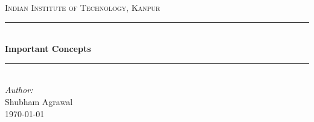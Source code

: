 \begin{titlepage}

\newcommand{\HRule}{\rule{\linewidth}{0.5mm}} %

\center %
 

\textsc{\LARGE Indian Institute of Technology, Kanpur}\\[1.5cm] %


\HRule \\[0.4cm]
{ \huge \bfseries Important Concepts}\\[0.4cm] %
\HRule \\[1.5cm]
 



\Large \emph{Author:}\\
Shubham Agrawal\\[3cm] %


{\large \today}\\[2cm] %



 

\vfill %

\end{titlepage}


